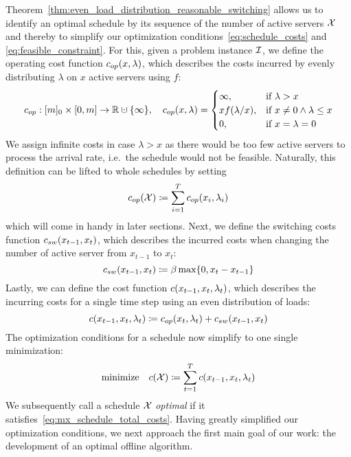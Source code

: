 Theorem~\ref{thm:even_load_distribution_reasonable_switching} allows us to identify an optimal schedule by its sequence of the number of active servers $\mathcal{X}$ and thereby to simplify our optimization conditions~\eqref{eq:schedule_costs} and \eqref{eq:feasible_constraint}. 
For this, given a problem instance $\mathcal{I}$, we define the operating cost function $c_{op}(x,\lambda)$, which describes the costs incurred by evenly distributing $\lambda$ on $x$ active servers using $f$:
\begin{equation}\label{eq:mx_schedule_op_costs}
	\opcosts:[m]_0\times[0,m]\rightarrow\mathbb{R}\dotcup\{\infty\},\quad \opcosts(x,\lambda)=\begin{cases}
	  \infty, & \text{if $\lambda>x$}\\
	  xf(\lambda/x), & \text{if $x\ne 0\land\lambda\le x$}\\
          0, & \text{if $x=\lambda=0$}
	  \end{cases}
\end{equation}
We assign infinite costs in case $\lambda>x$ as there would be too few active servers to process the arrival rate, i.e.\ the schedule would not be feasible. Naturally, this definition can be lifted to whole schedules by setting
\begin{equation}\label{eq:mx_schedule_op_costs_complete}
	c_{op}(\mathcal{X})\coloneqq\sum\limits_{i=1}^Tc_{op}(x_i,\lambda_i)
\end{equation}
which will come in handy in later sections. Next, we define the switching costs function $c_{sw}(x_{t-1},x_t)$, which describes the incurred costs when changing the number of active server from $x_{t-1}$ to $x_t$:
\begin{equation}\label{eq:mx_schedule_sw_costs}
	c_{sw}(x_{t-1},x_t)\coloneqq\beta\max\{0,x_t-x_{t-1}\}
\end{equation}
Lastly, we can define the cost function $c(x_{t-1},x_t,\lambda_t)$, which describes the incurring costs for a single time step using an even distribution of loads:
\begin{equation}\label{eq:mx_schedule_costs}
	c(x_{t-1},x_{t},\lambda_t)\coloneqq c_{op}(x_t,\lambda_t)+c_{sw}(x_{t-1},x_t)
\end{equation}
The optimization conditions for a schedule now simplify to one single minimization:
\begin{align}
	\text{minimize}\quad c(\mathcal{X})\coloneqq\sum\limits_{t=1}^{T}c(x_{t-1},x_{t},\lambda_t)\label{eq:mx_schedule_total_costs}
\end{align}
We subsequently call a schedule $\mathcal{X}$ \emph{optimal} if it satisfies~\eqref{eq:mx_schedule_total_costs}. Having greatly simplified our optimization conditions, we next approach the first main goal of our work: the development of an optimal offline algorithm.
